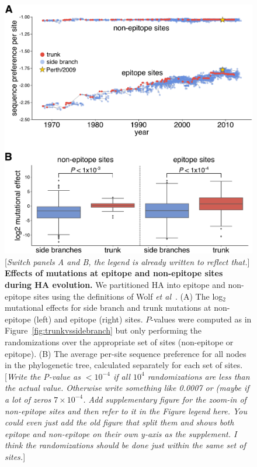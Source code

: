 \documentclass[9pt,twocolumn,twoside]{pnas-new}
\newcommand{\comment}[1]{{\color{red}[\textsl{#1}]}}
\begin{document}
\begin{figure}
\centering
\includegraphics[width=\columnwidth]{figs/sequence_preference/sequence_preference.pdf}
\caption{\label{fig:sequence_preference}
\comment{Switch panels A and B, the legend is already written to reflect that.}
{\bf Effects of mutations at epitope and non-epitope sites during HA evolution.}
We partitioned HA into epitope and non-epitope sites using the definitions of Wolf \textit{et al}~\cite{wolf2006long}.
(A) The log$_{2}$ mutational effects for side branch and trunk mutations at non-epitope (left) and epitope (right) sites.
$P$-values were computed as in Figure~\ref{fig:trunkvssidebranch} but only performing the randomizations over the appropriate set of sites (non-epitope or epitope).
(B) 
The average per-site sequence preference for all nodes in the phylogenetic tree, calculated separately for each set of sites.
\comment{Write the P-value as $<10^{-4}$ if \emph{all} $10^4$ randomizations are less than the actual value. Otherwise write something like 0.0007 or (maybe if a lot of zeros $7\times10^{-4}$.
Add supplementary figure for the zoom-in of non-epitope sites and then refer to it in the Figure legend here. You could even just add the old figure that split them and shows both epitope and non-epitope on their own y-axis as the supplement.
I think the randomizations should be done just within the same set of sites.}
}
\end{figure}
\end{document}
